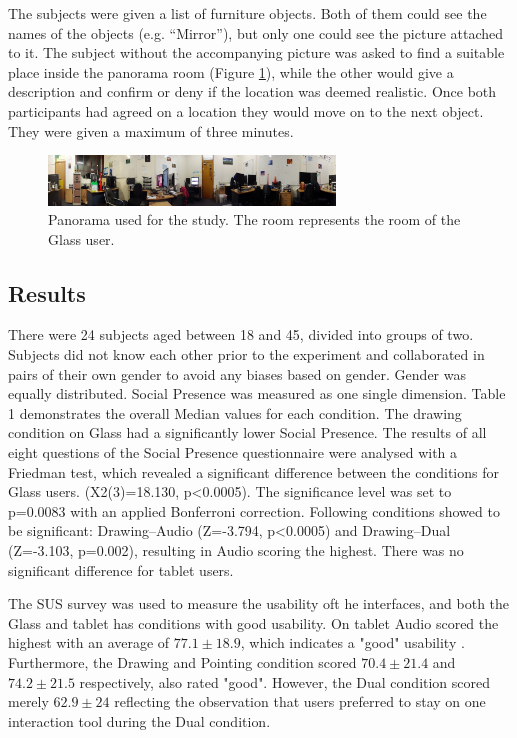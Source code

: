 The subjects were given a list of furniture objects. Both of them could see the names of the objects (e.g. “Mirror”), but only one could see the picture attached to it. The subject without the accompanying picture was asked to find a suitable place inside the panorama room (Figure \ref{fig:ismar14:envrionment-setup}), while the other would give a description and confirm or deny if the location was deemed realistic. Once both participants had agreed on a location they would move on to the next object. They were given a maximum of three minutes.

\begin{figure}[ht]
	\centering
	\includegraphics[width=3in]{images/ismar14/envrionment-setup}
	\caption{Panorama used for the study. The room represents the room of the Glass user.}
	\label{fig:ismar14:envrionment-setup}
\end{figure}

\subsection{Results}

There were 24 subjects aged between 18 and 45, divided into groups of two. Subjects did not know each other prior to the experiment and collaborated in pairs of their own gender to avoid any biases based on gender. Gender was equally distributed. Social Presence was measured as one single dimension. Table 1 demonstrates the overall Median values for each condition. The drawing condition on Glass had a significantly lower Social Presence. The results of all eight questions of the Social Presence questionnaire were analysed with a Friedman test, which revealed a significant difference between the conditions for Glass users. (X2(3)=18.130, p<0.0005). The significance level was set to p=0.0083 with an applied Bonferroni correction. Following conditions showed to be significant: Drawing–Audio (Z=-3.794, p<0.0005) and Drawing–Dual (Z=-3.103, p=0.002), resulting in Audio scoring the highest. There was no significant difference for tablet users.

The SUS survey was used to measure the usability oft he interfaces, and both the Glass and tablet has conditions with good usability. On tablet Audio scored the highest with an average of $77.1\pm18.9$, which indicates a "good" usability \cite{Bangor2008}. Furthermore, the Drawing and Pointing condition scored $70.4\pm21.4$ and $74.2\pm21.5$ respectively, also rated "good". However, the Dual condition scored merely $62.9\pm24$ reflecting the observation that users preferred to stay on one interaction tool during the Dual condition.

